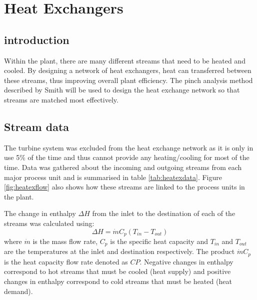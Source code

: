 


%

\section{Heat Exchangers}
\subsection{introduction}

Within the plant, there are many different streams that need to be heated and cooled. By designing a network of heat exchangers, heat can transferred between these streams, thus improving overall plant efficiency. The pinch analysis method described by Smith \cite{hexbook} \cite{lecture:hex} will be used to design the heat exchange network so that streams are matched most effectively. 

\subsection{Stream data}
The turbine system was excluded from the heat exchange network as it is only in use 5\% of the time and thus cannot provide any heating/cooling for most of the time. Data was gathered about the incoming and outgoing streams from each major process unit and is summarised in table \ref{tab:heatexdata}. Figure \ref{fig:heatexflow} also shows how these streams are linked to the process units in the plant.

The change in enthalpy $\Delta H$ from the inlet to the destination of each of the streams was calculated using:
\begin{equation} \label{eq:heatex}
\Delta H = \dot{m} C_p (T_{in} - T_{out})
\end{equation}
where $\dot{m}$ is the mass flow rate, $C_p$ is the specific heat capacity and $T_{in}$ and $T_{out}$ are the temperatures at the inlet and destination respectively. The product $\dot{m} C_p$ is the heat capacity flow rate denoted as $CP$. Negative changes in enthalpy correspond to hot streams that must be cooled (heat supply) and positive changes in enthalpy correspond to cold streams that must be heated (heat demand).

